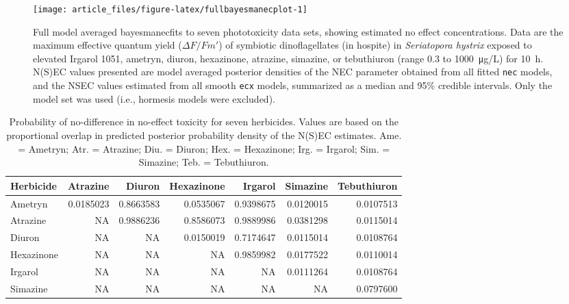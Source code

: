 \documentclass[
  shortnames]{jss}
\begin{document}
\begin{CodeChunk}
\begin{figure}[!ht]

{\centering \texttt{[image: article\_files/figure-latex/fullbayesmanecplot-1]} 

}

\caption{Full model averaged bayesmanecfits to seven phototoxicity data sets, showing estimated no effect concentrations. Data are the maximum effective quantum yield ($\Delta F / Fm'$) of symbiotic dinoflagellates (in hospite) in \textit{Seriatopora hystrix} exposed to elevated Irgarol 1051, ametryn, diuron, hexazinone, atrazine, simazine, or tebuthiuron (range 0.3 to \SI{1000}{\micro\gram/\liter}) for \SI{10}{\hour}. N(S)EC values presented are model averaged posterior densities of the NEC parameter obtained from all fitted \texttt{nec} models, and the NSEC values estimated from all smooth \texttt{ecx} models, summarized as a median and 95\% credible intervals. Only the  model set was used (i.e., hormesis models were excluded).}\label{fig:fullbayesmanecplot}
\end{figure}
\end{CodeChunk}

\begin{CodeChunk}
\begin{table}

\caption{\label{tab:probdiffs}Probability of no-difference in no-effect toxicity for seven herbicides. Values are based on the proportional overlap in predicted posterior probability density of the N(S)EC estimates. Ame. = Ametryn; Atr. = Atrazine; Diu. = Diuron; Hex. = Hexazinone; Irg. = Irgarol; Sim. = Simazine; Teb. = Tebuthiuron.}
\centering
\begin{tabular}[t]{l|r|r|r|r|r|r}
\hline
Herbicide & Atrazine & Diuron & Hexazinone & Irgarol & Simazine & Tebuthiuron\\
\hline
Ametryn & 0.0185023 & 0.8663583 & 0.0535067 & 0.9398675 & 0.0120015 & 0.0107513\\
\hline
Atrazine & NA & 0.9886236 & 0.8586073 & 0.9889986 & 0.0381298 & 0.0115014\\
\hline
Diuron & NA & NA & 0.0150019 & 0.7174647 & 0.0115014 & 0.0108764\\
\hline
Hexazinone & NA & NA & NA & 0.9859982 & 0.0177522 & 0.0110014\\
\hline
Irgarol & NA & NA & NA & NA & 0.0111264 & 0.0108764\\
\hline
Simazine & NA & NA & NA & NA & NA & 0.0797600\\
\hline
\end{tabular}
\end{table}

\end{CodeChunk}
\end{document}
